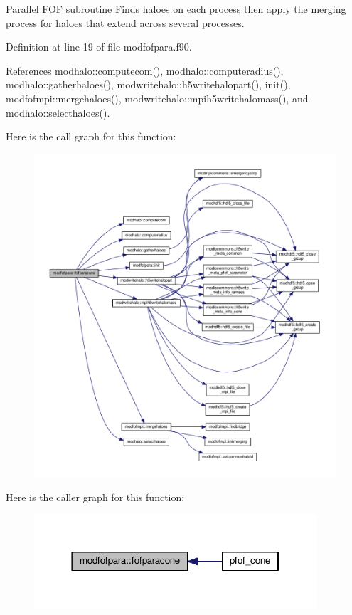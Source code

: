 Parallel F\-O\-F subroutine Finds haloes on each process then apply the merging process for haloes that extend across several processes. 



Definition at line 19 of file modfofpara.\-f90.



References modhalo\-::computecom(), modhalo\-::computeradius(), modhalo\-::gatherhaloes(), modwritehalo\-::h5writehalopart(), init(), modfofmpi\-::mergehaloes(), modwritehalo\-::mpih5writehalomass(), and modhalo\-::selecthaloes().



Here is the call graph for this function\-:\nopagebreak
\begin{figure}[H]
\begin{center}
\leavevmode
\includegraphics[width=350pt]{classmodfofpara_a033a2820dd29f107782b566ca298bde4_cgraph}
\end{center}
\end{figure}




Here is the caller graph for this function\-:\nopagebreak
\begin{figure}[H]
\begin{center}
\leavevmode
\includegraphics[width=298pt]{classmodfofpara_a033a2820dd29f107782b566ca298bde4_icgraph}
\end{center}
\end{figure}


